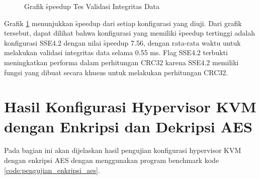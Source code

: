 \begin{figure}
    \centering
    \caption{Grafik \f{speedup} Tes Validasi Integritas Data}
    \label{fig:file_integrity_test_graph}
\end{figure}

Grafik \ref{fig:file_integrity_test_graph} menunjukkan \f{speedup} dari setiap konfigurasi yang diuji. Dari grafik tersebut, dapat dilihat bahwa konfigurasi yang memiliki \f{speedup} tertinggi adalah konfigurasi SSE4.2 dengan nilai \f{speedup} 7.56, dengan rata-rata waktu untuk melakukan validasi integritas data selama 0.55 ms. Flag SSE4.2 terbukti meningkatkan performa dalam perhitungan CRC32 karena SSE4.2 memiliki fungsi yang dibuat secara khusus untuk melakukan perhitungan CRC32.

\section{Hasil Konfigurasi Hypervisor KVM dengan Enkripsi dan Dekripsi AES}
Pada bagian ini akan dijelaskan hasil pengujian konfigurasi hypervisor KVM dengan enkripsi AES dengan menggunakan program benchmark kode \ref{code:pengujian_enkripsi_aes}.

